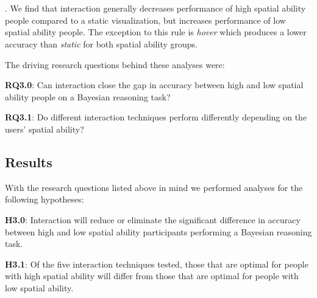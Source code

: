 \section{} 
 . We find that interaction generally decreases performance of high spatial ability people compared to a static visualization, but increases performance of low spatial ability people. The exception to this rule is \textit{hover} which produces a lower accuracy than \textit{static} for both spatial ability groups.   

\noindent  The driving research questions behind these analyses were: 
\begin{compacthang}
\item  \textbf{RQ3.0}: Can interaction close the gap in accuracy  between high and low spatial ability people on a Bayesian reasoning task?
\item \textbf{RQ3.1}: Do different interaction techniques perform differently depending on the users' spatial ability?  
\end{compacthang}

\subsection{Results}
With the research questions listed above in mind we performed analyses for the following hypotheses: 
\begin{compacthang} 
	\item \textbf{H3.0}: Interaction will reduce or eliminate the significant difference in accuracy between high and low spatial ability participants performing a Bayesian reasoning task.     
	\item \textbf{H3.1}: Of the five interaction techniques tested, those that are optimal for people with high spatial ability will differ from those that are optimal for people with low spatial ability. 
\end{compacthang}

